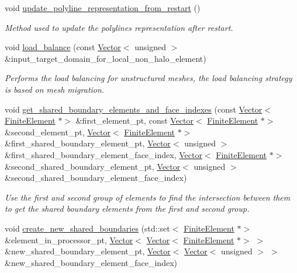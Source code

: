 \begin{DoxyCompactItemize}
\item 
void \hyperlink{classoomph_1_1RefineableTriangleMesh_a26cdfda4b77158dd24641cb5889ad2ff}{update\+\_\+polyline\+\_\+representation\+\_\+from\+\_\+restart} ()
\begin{DoxyCompactList}\small\item\em Method used to update the polylines representation after restart. \end{DoxyCompactList}\item 
void \hyperlink{classoomph_1_1RefineableTriangleMesh_aaffa40b7d036f8ed8639bf9396f1088a}{load\+\_\+balance} (const \hyperlink{classoomph_1_1Vector}{Vector}$<$ unsigned $>$ \&input\+\_\+target\+\_\+domain\+\_\+for\+\_\+local\+\_\+non\+\_\+halo\+\_\+element)
\begin{DoxyCompactList}\small\item\em Performs the load balancing for unstructured meshes, the load balancing strategy is based on mesh migration. \end{DoxyCompactList}\item 
void \hyperlink{classoomph_1_1RefineableTriangleMesh_a51a28f4e7fccb020234c055bb42b8ef5}{get\+\_\+shared\+\_\+boundary\+\_\+elements\+\_\+and\+\_\+face\+\_\+indexes} (const \hyperlink{classoomph_1_1Vector}{Vector}$<$ \hyperlink{classoomph_1_1FiniteElement}{Finite\+Element} $\ast$$>$ \&first\+\_\+element\+\_\+pt, const \hyperlink{classoomph_1_1Vector}{Vector}$<$ \hyperlink{classoomph_1_1FiniteElement}{Finite\+Element} $\ast$$>$ \&second\+\_\+element\+\_\+pt, \hyperlink{classoomph_1_1Vector}{Vector}$<$ \hyperlink{classoomph_1_1FiniteElement}{Finite\+Element} $\ast$$>$ \&first\+\_\+shared\+\_\+boundary\+\_\+element\+\_\+pt, \hyperlink{classoomph_1_1Vector}{Vector}$<$ unsigned $>$ \&first\+\_\+shared\+\_\+boundary\+\_\+element\+\_\+face\+\_\+index, \hyperlink{classoomph_1_1Vector}{Vector}$<$ \hyperlink{classoomph_1_1FiniteElement}{Finite\+Element} $\ast$$>$ \&second\+\_\+shared\+\_\+boundary\+\_\+element\+\_\+pt, \hyperlink{classoomph_1_1Vector}{Vector}$<$ unsigned $>$ \&second\+\_\+shared\+\_\+boundary\+\_\+element\+\_\+face\+\_\+index)
\begin{DoxyCompactList}\small\item\em Use the first and second group of elements to find the intersection between them to get the shared boundary elements from the first and second group. \end{DoxyCompactList}\item 
void \hyperlink{classoomph_1_1RefineableTriangleMesh_adb26d1dbe4f06311599020171ec45140}{create\+\_\+new\+\_\+shared\+\_\+boundaries} (std\+::set$<$ \hyperlink{classoomph_1_1FiniteElement}{Finite\+Element} $\ast$$>$ \&element\+\_\+in\+\_\+processor\+\_\+pt, \hyperlink{classoomph_1_1Vector}{Vector}$<$ \hyperlink{classoomph_1_1Vector}{Vector}$<$ \hyperlink{classoomph_1_1FiniteElement}{Finite\+Element} $\ast$$>$ $>$ \&new\+\_\+shared\+\_\+boundary\+\_\+element\+\_\+pt, \hyperlink{classoomph_1_1Vector}{Vector}$<$ \hyperlink{classoomph_1_1Vector}{Vector}$<$ unsigned $>$ $>$ \&new\+\_\+shared\+\_\+boundary\+\_\+element\+\_\+face\+\_\+index)

\end{DoxyCompactItemize}
